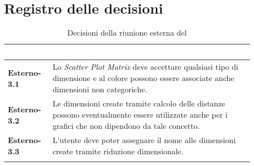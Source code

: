 \section{Registro delle decisioni}
{
\renewcommand{\arraystretch}{1.5}
\centering
\begin{longtable}{C{3cm} C{9cm}}
\textcolor{white}{\textbf{Codice}}&
\textcolor{white}{\textbf{Decisione}}\\	
\endhead
		
\textbf{Esterno-3.1} & Lo \textit{Scatter Plot Matrix} deve accettare qualsiasi tipo di dimensione e al colore possono essere associate anche dimensioni non categoriche.\\

\textbf{Esterno-3.2} & Le dimensioni create tramite calcolo delle distanze possono eventualmente essere utilizzate anche per i grafici che non dipendono da tale concetto.\\

\textbf{Esterno-3.3} & L'utente deve poter assegnare il nome alle dimensioni create tramite riduzione dimensionale.\\

\caption{Decisioni della riunione esterna del \Data{}}
		
\end{longtable}
}

